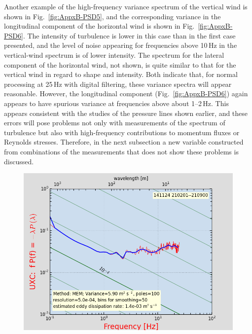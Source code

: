 \documentclass[12pt,twoside,english]{article}\usepackage[]{graphicx}\usepackage[]{color}
\let\OrgIndex\index
\renewcommand*{\index}[1]{\OrgIndex{#1}}
\begin{document}
{{Another example of the high-frequency variance spectrum of the vertical wind is shown in Fig.~\ref{fig:AppxB-PSD5}, and the corresponding variance in the longitudinal component of the horizontal wind is shown in Fig.~\ref{fig:AppxB-PSD6}. The intensity of turbulence is lower in this case than in the first case presented, and the level of noise appearing for frequencies above 10\,Hz in the vertical-wind spectrum is of lower intensity. The spectrum for the lateral component of the horizontal wind, not shown, is quite similar to that for the vertical wind in regard to shape and intensity. Both indicate that, for normal processing at 25\,Hz with digital filtering, these variance spectra will appear reasonable. However, the longitudinal component (Fig.~\ref{fig:AppxB-PSD6}) again appears to have spurious variance at frequencies above about 1--2\,Hz. This appears consistent with the studies of the pressure lines shown earlier, and these errors will pose problems not only with measurements of the spectrum of turbulence but also with high-frequency contributions to momentum fluxes or Reynolds stresses. Therefore, in the next subsection a new variable constructed from combinations of the measurements that does not show these problems is discussed. 

\begin{figure}
\noindent \begin{centering}
\includegraphics[height=0.4\textheight]{SpecialGraphics/PSD6.png}  
\par\end{centering}


\end{figure}}}
\end{document}
